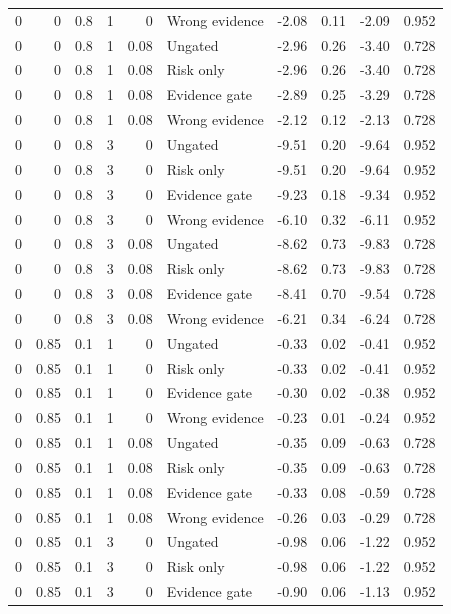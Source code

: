 \begin{longtable}{rrrrrlrrrr}
0 & 0 & 0.8 & 1 & 0 & Wrong evidence & -2.08 & 0.11 & -2.09 & 0.952\\
0 & 0 & 0.8 & 1 & 0.08 & Ungated & -2.96 & 0.26 & -3.40 & 0.728\\
0 & 0 & 0.8 & 1 & 0.08 & Risk only & -2.96 & 0.26 & -3.40 & 0.728\\
0 & 0 & 0.8 & 1 & 0.08 & Evidence gate & -2.89 & 0.25 & -3.29 & 0.728\\
0 & 0 & 0.8 & 1 & 0.08 & Wrong evidence & -2.12 & 0.12 & -2.13 & 0.728\\
0 & 0 & 0.8 & 3 & 0 & Ungated & -9.51 & 0.20 & -9.64 & 0.952\\
0 & 0 & 0.8 & 3 & 0 & Risk only & -9.51 & 0.20 & -9.64 & 0.952\\
0 & 0 & 0.8 & 3 & 0 & Evidence gate & -9.23 & 0.18 & -9.34 & 0.952\\
0 & 0 & 0.8 & 3 & 0 & Wrong evidence & -6.10 & 0.32 & -6.11 & 0.952\\
0 & 0 & 0.8 & 3 & 0.08 & Ungated & -8.62 & 0.73 & -9.83 & 0.728\\
0 & 0 & 0.8 & 3 & 0.08 & Risk only & -8.62 & 0.73 & -9.83 & 0.728\\
0 & 0 & 0.8 & 3 & 0.08 & Evidence gate & -8.41 & 0.70 & -9.54 & 0.728\\
0 & 0 & 0.8 & 3 & 0.08 & Wrong evidence & -6.21 & 0.34 & -6.24 & 0.728\\
0 & 0.85 & 0.1 & 1 & 0 & Ungated & -0.33 & 0.02 & -0.41 & 0.952\\
0 & 0.85 & 0.1 & 1 & 0 & Risk only & -0.33 & 0.02 & -0.41 & 0.952\\
0 & 0.85 & 0.1 & 1 & 0 & Evidence gate & -0.30 & 0.02 & -0.38 & 0.952\\
0 & 0.85 & 0.1 & 1 & 0 & Wrong evidence & -0.23 & 0.01 & -0.24 & 0.952\\
0 & 0.85 & 0.1 & 1 & 0.08 & Ungated & -0.35 & 0.09 & -0.63 & 0.728\\
0 & 0.85 & 0.1 & 1 & 0.08 & Risk only & -0.35 & 0.09 & -0.63 & 0.728\\
0 & 0.85 & 0.1 & 1 & 0.08 & Evidence gate & -0.33 & 0.08 & -0.59 & 0.728\\
0 & 0.85 & 0.1 & 1 & 0.08 & Wrong evidence & -0.26 & 0.03 & -0.29 & 0.728\\
0 & 0.85 & 0.1 & 3 & 0 & Ungated & -0.98 & 0.06 & -1.22 & 0.952\\
0 & 0.85 & 0.1 & 3 & 0 & Risk only & -0.98 & 0.06 & -1.22 & 0.952\\
0 & 0.85 & 0.1 & 3 & 0 & Evidence gate & -0.90 & 0.06 & -1.13 & 0.952\\

\end{longtable}
